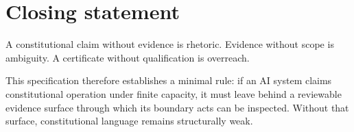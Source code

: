 \documentclass[11pt]{article}
\begin{document}
\section{Closing statement}

A constitutional claim without evidence is rhetoric.  
Evidence without scope is ambiguity.  
A certificate without qualification is overreach.  

This specification therefore establishes a minimal rule: if an AI system claims constitutional operation under finite capacity, it must leave behind a reviewable evidence surface through which its boundary acts can be inspected. Without that surface, constitutional language remains structurally weak.
\end{document}
